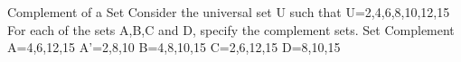 
Complement of a Set
Consider the universal set U such that U={2,4,6,8,10,12,15} 
For each of the sets A,B,C and D, specify the complement sets.
Set	Complement
A={4,6,12,15}	A’={2,8,10}  
B={4,8,10,15}	
C={2,6,12,15}	
D={8,10,15}	



 


